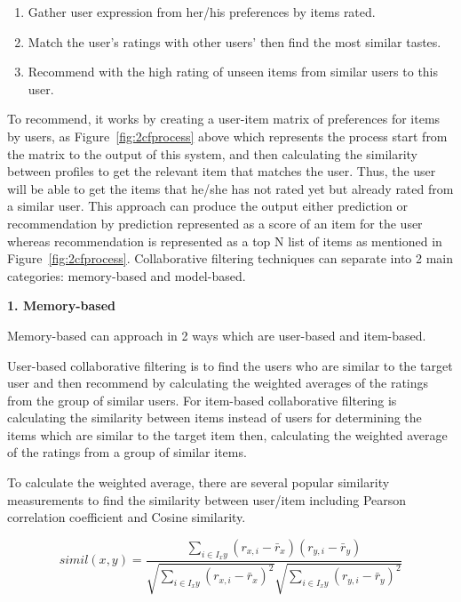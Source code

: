 \documentclass[12pt,oneside,openright,a4paper]{cpe-english-project}
\begin{document}
\begin{enumerate}
\item Gather user expression from her/his preferences by items rated.
\item Match the user’s ratings with other users’ then find the most similar tastes.
\item Recommend with the high rating of unseen items from similar users to this user.
\end{enumerate}

To recommend, it works by creating a user-item matrix of preferences for items by users, as Figure~\ref{fig:2cfprocess} above which represents the process start from the matrix to the output of this system, and then calculating the similarity between profiles to get the relevant item that matches the user. Thus, the user will be able to get the items that he/she has not rated yet but already rated from a similar user. This approach can produce the output either prediction or recommendation by prediction represented as a score of an item for the user whereas recommendation is represented as a top N list of items as mentioned in Figure~\ref{fig:2cfprocess}. Collaborative filtering techniques can separate into 2 main categories: memory-based and model-based.


\textbf{1. Memory-based}\par

Memory-based can approach in 2 ways which are user-based and item-based.

User-based collaborative filtering is to find the users who are similar to the target user and then recommend by calculating the weighted averages of the ratings from the group of similar users. For item-based collaborative filtering is calculating the similarity between items instead of users for determining the items which are similar to the target item then, calculating the weighted average of the ratings from a group of similar items.

To calculate the weighted average, there are several popular similarity measurements to find the similarity between user/item including Pearson correlation coefficient and Cosine similarity.

\begin{equation}\label{eq:simil}
simil(x, y) = \frac{\sum_{i\in I_xy}^{}(r_{x,i}-\bar{r}_{x})(r_{y,i}-\bar{r}_{y})}
{\sqrt{\sum_{i\in I_xy}^{}(r_{x,i}-\bar{r}_{x})^2}\sqrt{\sum_{i\in I_xy}^{}(r_{y,i}-\bar{r}_{y})^2}}
\end{equation}
\end{document}
